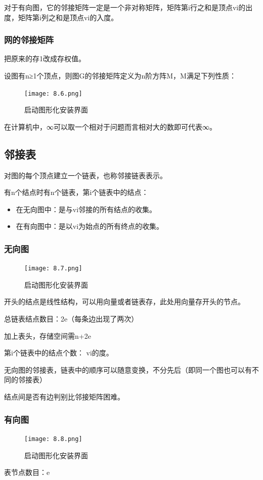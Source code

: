 \documentclass[AutoFakeBold]{LZUThesis2007}
\begin{document}
对于有向图，它的邻接矩阵一定是一个非对称矩阵，矩阵第i行之和是顶点vi的出度，矩阵第i列之和是顶点vi的入度。
			\subsubsection{网的邻接矩阵}
把原来的存1改成存权值。

设图有n≥1个顶点，则图G的邻接矩阵定义为n阶方阵M，M满足下列性质：

\begin{figure}[H]
    \centering
    \texttt{[image: 8.6.png]}
    \caption{启动图形化安装界面}
    \label{fig_install_texlive}
\end{figure}

在计算机中，∞可以取一个相对于问题而言相对大的数即可代表∞。
		\subsection{邻接表}
对图的每个顶点建立一个链表，也称邻接链表表示。

有n个结点时有n个链表，第i个链表中的结点：
			\begin{itemize}
				\item 在无向图中：是与vi邻接的所有结点的收集。
				\item 在有向图中：是以vi为始点的所有终点的收集。
			\end{itemize}

			\subsubsection{无向图}
\begin{figure}[H]
    \centering
    \texttt{[image: 8.7.png]}
    \caption{启动图形化安装界面}
    \label{fig_install_texlive}
\end{figure}
开头的结点是线性结构，可以用向量或者链表存，此处用向量存开头的节点。

总链表结点数目：2e（每条边出现了两次）

加上表头，存储空间需n+2e

第i个链表中的结点个数： vi的度。

无向图的邻接表，链表中的顺序可以随意变换，不分先后（即同一个图也可以有不同的邻接表）

结点间是否有边判别比邻接矩阵困难。
			\subsubsection{有向图}
\begin{figure}[H]
    \centering
    \texttt{[image: 8.8.png]}
    \caption{启动图形化安装界面}
    \label{fig_install_texlive}
\end{figure}
表节点数目：e
\end{document}
